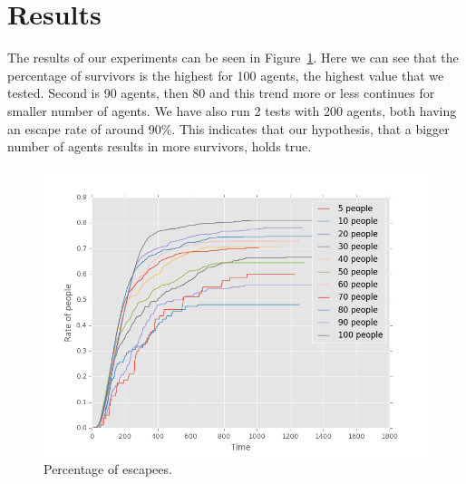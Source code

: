 \documentclass[a4paper]{article}
\begin{document}

\section{Results}
The results of our experiments can be seen in Figure~\ref{fig:escape}. Here we can see that the percentage of survivors is the highest for 100 agents, the highest value that we tested. Second is 90 agents, then 80 and this trend more or less continues for smaller number of agents. We have also run 2 tests with 200 agents, both having an escape rate of around 90\%. This indicates that our hypothesis, that a bigger number of agents results in more survivors, holds true. 

\begin{figure}[ht]
  \centering
  \includegraphics[width=\linewidth]{escaperate.png}
  \caption{Percentage of escapees.}
  \label{fig:escape}
\end{figure}
\end{document}

